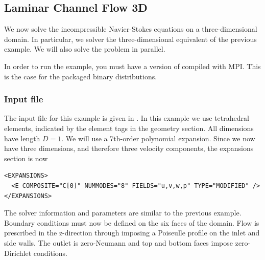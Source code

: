 \subsection{Laminar Channel Flow 3D}
We now solve the incompressible Navier-Stokes equations on a three-dimensional
domain. In particular, we solver the three-dimensional equivalent of the
previous example. We will also solve the problem in parallel.

\begin{notebox}
In order to run the example, you must have a version of \nekpp compiled with
MPI. This is the case for the packaged binary distributions.
\end{notebox}

\subsubsection{Input file}
The input file for this example is given in .
In this example we use tetrahedral elements, indicated by the  element
tags in the geometry section. All dimensions have length $D=1$. We will use a
7th-order polynomial expansion. Since we now have three dimensions, and
therefore three velocity components, the expansions section is now
\begin{lstlisting}[style=XMLStyle]
<EXPANSIONS>
  <E COMPOSITE="C[0]" NUMMODES="8" FIELDS="u,v,w,p" TYPE="MODIFIED" />
</EXPANSIONS>
\end{lstlisting}
The solver information and parameters are similar to the previous example.
Boundary conditions must now be defined on the six faces of the domain. Flow is
prescribed in the z-direction through imposing a Poiseulle profile on the inlet
and side walls. The outlet is zero-Neumann and top and bottom faces impose
zero-Dirichlet conditions.
